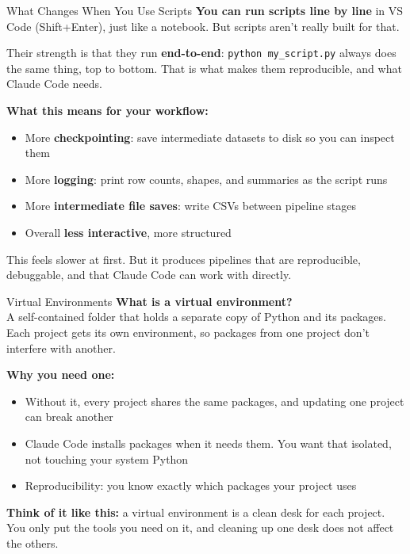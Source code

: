 \documentclass[aspectratio=169, 11pt]{beamer}
\begin{document}
\begin{frame}{What Changes When You Use Scripts}
  \textbf{You can run scripts line by line} in VS Code (Shift+Enter), just like a notebook. But scripts aren't really built for that.

  \vspace{0.5em}
  Their strength is that they run \textbf{end-to-end}: \lstinline{python my_script.py} always does the same thing, top to bottom. That is what makes them reproducible, and what Claude Code needs.

  \vspace{0.8em}
  \textbf{What this means for your workflow:}
  \begin{itemize}
    \item More \textbf{checkpointing}: save intermediate datasets to disk so you can inspect them
    \item More \textbf{logging}: print row counts, shapes, and summaries as the script runs
    \item More \textbf{intermediate file saves}: write CSVs between pipeline stages
    \item Overall \textbf{less interactive}, more structured
  \end{itemize}

  \vspace{0.5em}
  This feels slower at first. But it produces pipelines that are reproducible, debuggable, and that Claude Code can work with directly.
\end{frame}


\begin{frame}{Virtual Environments}
  \textbf{What is a virtual environment?}\\
  A self-contained folder that holds a separate copy of Python and its packages. Each project gets its own environment, so packages from one project don't interfere with another.

  \vspace{0.5em}
  \textbf{Why you need one:}
  \begin{itemize}
    \item Without it, every project shares the same packages, and updating one project can break another
    \item Claude Code installs packages when it needs them. You want that isolated, not touching your system Python
    \item Reproducibility: you know exactly which packages your project uses
  \end{itemize}

  \vspace{0.5em}
  \textbf{Think of it like this:} a virtual environment is a clean desk for each project. You only put the tools you need on it, and cleaning up one desk does not affect the others.
\end{frame}
\end{document}
